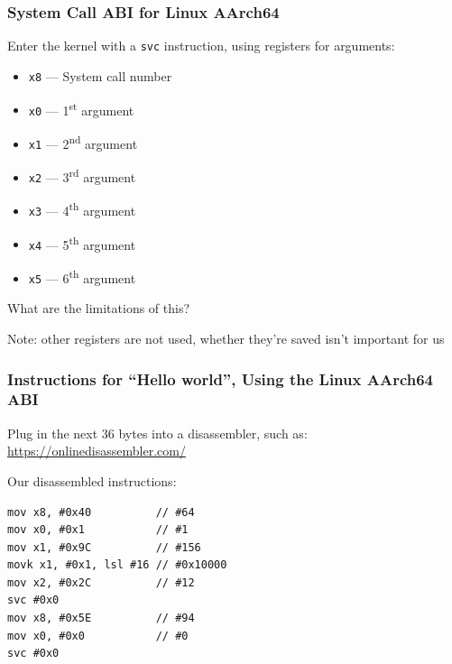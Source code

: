   \begin{frame}
    \frametitle{System Call ABI for Linux AArch64}

    Enter the kernel with a \texttt{svc} instruction, using registers for
    arguments:

    \begin{itemize}
      \item \texttt{x8} --- System call number
      \item \texttt{x0} --- 1\textsuperscript{st} argument
      \item \texttt{x1} --- 2\textsuperscript{nd} argument
      \item \texttt{x2} --- 3\textsuperscript{rd} argument
      \item \texttt{x3} --- 4\textsuperscript{th} argument
      \item \texttt{x4} --- 5\textsuperscript{th} argument
      \item \texttt{x5} --- 6\textsuperscript{th} argument
    \end{itemize}

    What are the limitations of this?

    \vspace{2em}

    Note: other registers are not used, whether they're saved isn't important
    for us
  \end{frame}

  \begin{frame}[fragile]
    \frametitle{Instructions for ``Hello world'', Using the Linux AArch64 ABI}

    Plug in the next 36 bytes into a disassembler, such as:
    \url{https://onlinedisassembler.com/}

    \vspace{2em}

    Our disassembled instructions:
    \begin{lstlisting}[xleftmargin=2em]
mov x8, #0x40          // #64
mov x0, #0x1           // #1
mov x1, #0x9C          // #156
movk x1, #0x1, lsl #16 // #0x10000
mov x2, #0x2C          // #12
svc #0x0
mov x8, #0x5E          // #94
mov x0, #0x0           // #0
svc #0x0
    \end{lstlisting}
  \end{frame}

